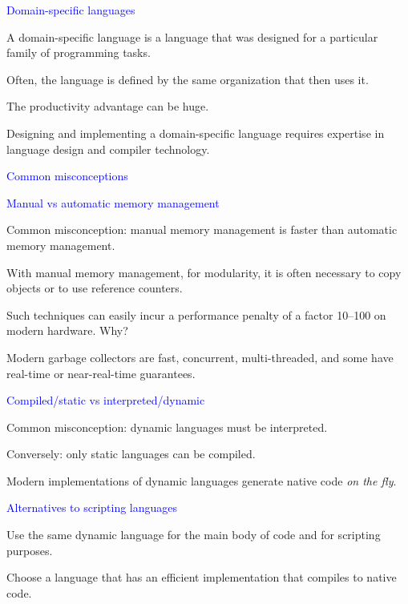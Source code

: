 \documentclass{slides}
\newcommand{\ti}[1]{\begin{center}\Large{\textcolor{blue}{#1}}\end{center}}
\begin{document}
\begin{slide}\ti{Domain-specific languages}

A domain-specific language is a language that was designed for a
particular family of programming tasks.

Often, the language is defined by the same organization that then uses
it.

The productivity advantage can be huge.

Designing and implementing a domain-specific language requires
expertise in language design and compiler technology.

\vfill\end{slide}
\begin{slide}\ti{Common misconceptions}

\vfill\end{slide}
\begin{slide}\ti{Manual vs automatic memory management}

Common misconception: manual memory management is faster than
automatic memory management.

With manual memory management, for modularity, it is often necessary
to copy objects or to use reference counters.

Such techniques can easily incur a performance penalty of a factor
10--100 on modern hardware.  Why?

Modern garbage collectors are fast, concurrent, multi-threaded, and
some have real-time or near-real-time guarantees.

\vfill\end{slide}
\begin{slide}\ti{Compiled/static vs interpreted/dynamic}

Common misconception: dynamic languages must be interpreted.

Conversely: only static languages can be compiled.

Modern implementations of dynamic languages generate native code
\emph{on the fly}.

\vfill\end{slide}
\begin{slide}\ti{Alternatives to scripting languages}

Use the same dynamic language for the main body of code and for
scripting purposes.

Choose a language that has an efficient implementation that compiles
to native code.

\vfill\end{slide}
\end{document}
